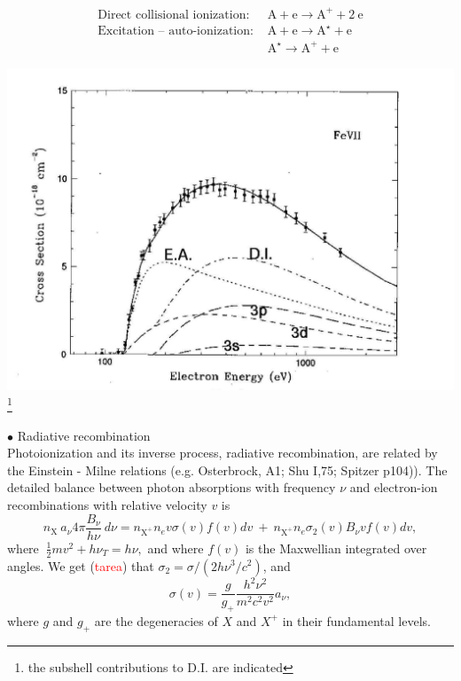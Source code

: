 \vspace{-2cm}
\begin{eqnarray}
\text{Direct collisional ionization: }  & \mathrm{A} + \mathrm{e} \rightarrow \mathrm{A^+} + 2~\mathrm{e}   \nonumber \\ 
\text{Excitation -- auto-ionization: }  & \mathrm{A} + \mathrm{e} \rightarrow \mathrm{A^\star} + \mathrm{e}   \nonumber  \\
                                         & \mathrm{A^{\star}}  \rightarrow \mathrm{A^+} + \mathrm{e}   \nonumber  
\end{eqnarray}
\vspace{-2cm}
\begin{center}
  \includegraphics[width=17cm,height=!]{./C/colion_xsec_2.jpg}
  \footnote{the subshell contributions to D.I. are indicated}
\end{center}



{$\bullet$ Radiative recombination} \\

Photoionization and its inverse process, radiative recombination, are
related by the Einstein - Milne relations (e.g. Osterbrock, A1; Shu
I,75; Spitzer p104)).  The detailed balance between photon absorptions
with frequency $\nu$ and electron-ion recombinations with relative
velocity $v$ is
\[
n_\mathrm{X} ~a_\nu 4 \pi \frac{B_\nu}{h \nu} ~d\nu = n_{\mathrm{X}^+} n_e
v \sigma(v) f(v) dv~ +~ n_{\mathrm{X}^+} n_e \sigma_2(v)  B_\nu v f(v) dv,
\]
where $~\frac{1}{2} m v^2 + h \nu_T = h \nu,$ and where $f(v)$ is the
Maxwellian integrated over angles. We get (\textcolor{red}{tarea}) that
$\sigma_2 = \sigma / (2 h \nu^3 / c^2 )$, and 
\[
\sigma(v) = \frac{g}{g_{+}}   \frac{h^2  \nu^2 }{m^2 c^2 v^2} a_\nu,    
\] 
where $g$ and $g_+$ are the degeneracies of  $X$
 and  $X^+$ in their fundamental levels.


